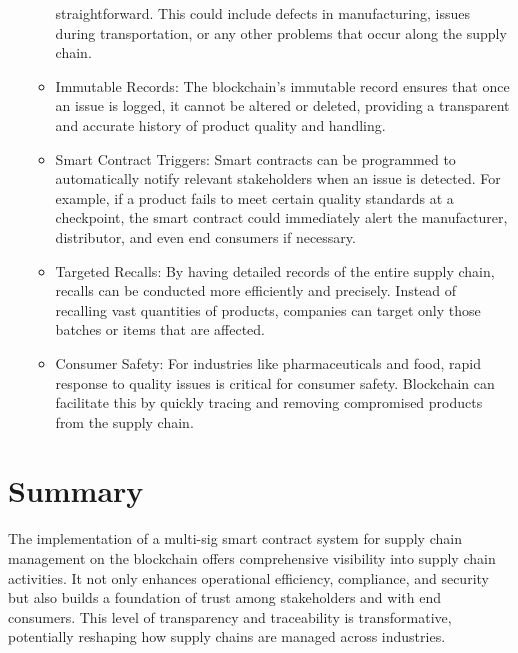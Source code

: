 \documentclass{tufte-handout}
\begin{document}
\begin{itemize}
\begin{itemize}
    straightforward. This could include defects in manufacturing, issues during transportation, or any other problems that occur along the supply chain.
    \item Immutable Records: The blockchain's immutable record ensures that once an issue is logged, it cannot be altered or deleted, providing a transparent
    and accurate history of product quality and handling.
    \item Smart Contract Triggers: Smart contracts can be programmed to automatically notify relevant stakeholders when an issue is detected. For example,
    if a product fails to meet certain quality standards at a checkpoint, the smart contract could immediately alert the manufacturer, distributor, and
    even end consumers if necessary.
    \item Targeted Recalls: By having detailed records of the entire supply chain, recalls can be conducted more efficiently and precisely. Instead of
    recalling vast quantities of products, companies can target only those batches or items that are affected.
    \item Consumer Safety: For industries like pharmaceuticals and food, rapid response to quality issues is critical for consumer safety. Blockchain can
    facilitate this by quickly tracing and removing compromised products from the supply chain.
\end{itemize}
\end{itemize}

\section{Summary}\label{sec:page-layout}
The implementation of a multi-sig smart contract system for supply chain management on the blockchain offers comprehensive visibility into supply chain
activities. It not only enhances operational efficiency, compliance, and security but also builds a foundation of trust among stakeholders and with end
consumers. This level of transparency and traceability is transformative, potentially reshaping how supply chains are managed across industries.


\end{document}
